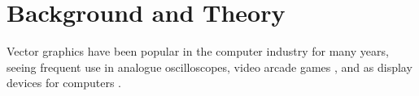 \chapter{Background and Theory}

Vector graphics have been popular in the computer industry for many years,
seeing frequent use in analogue oscilloscopes, video arcade games \cite{astroids}, 
and as display devices for computers \cite{ibm2250}.



